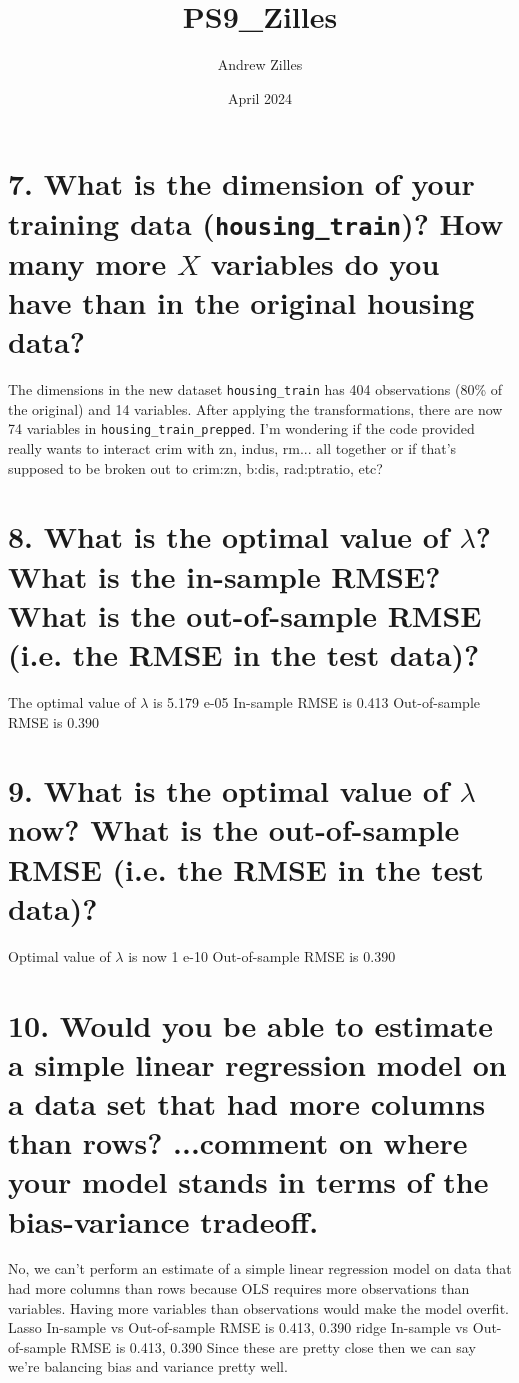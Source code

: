 \documentclass{article}
\title{PS9\_Zilles}
\author{Andrew Zilles}
\date{April 2024}
\begin{document}
\maketitle

\section*{7. What is the dimension of your training data (\texttt{housing\_train})? How many more $X$ variables do you have than in the original housing data?}

The dimensions in the new dataset \texttt{housing\_train} has 404 observations (80\% of the original) and 14 variables.
After applying the transformations, there are now 74 variables in \texttt{housing\_train\_prepped}.
I'm wondering if the code provided really wants to interact crim with zn, indus, rm... all together or if that's supposed to be broken out to crim:zn, b:dis, rad:ptratio, etc?



\section*{8. What is the optimal value of $\lambda$? What is the in-sample RMSE? What is the out-of-sample RMSE (i.e. the RMSE in the test data)?}
The optimal value of $\lambda$ is 5.179 e-05
In-sample RMSE is 0.413
Out-of-sample RMSE is 0.390



\section*{9. What is the optimal value of $\lambda$ now? What is the out-of-sample RMSE (i.e. the RMSE in the test data)?}
Optimal value of $\lambda$ is now 1 e-10
Out-of-sample RMSE is 0.390



\section*{10. Would you be able to estimate a simple linear regression model on a data set that had more columns than rows? ...comment on where your model stands in terms of the bias-variance tradeoff.}
No, we can't perform an estimate of a simple linear regression model on data that had more columns than rows because OLS requires more observations than variables. Having more variables than observations would make the model overfit. 
Lasso In-sample vs Out-of-sample RMSE is 0.413, 0.390
ridge In-sample vs Out-of-sample RMSE is 0.413, 0.390
Since these are pretty close then we can say we're balancing bias and variance pretty well.
\end{document}

